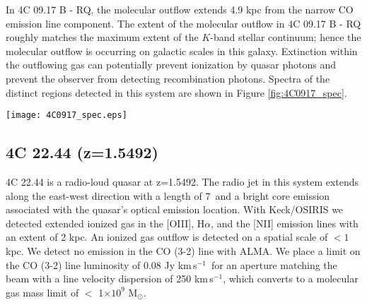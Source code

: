 \documentclass[twocolumn]{aastex63}
\newcommand{\msun}{M$_{\odot}$}
\newcommand{\ha}{H$\alpha$\xspace}
\newcommand{\nii}{[N{\sc II}]\xspace}
\newcommand{\oiii}{[O{\sc III}]\xspace}
\newcommand{\kms}{km\,s$^{-1}$}
\begin{document}
In 4C 09.17 B - RQ, the molecular outflow extends 4.9 kpc from the narrow CO emission line component. The extent of the molecular outflow in 4C 09.17 B - RQ roughly matches the maximum extent of the $K$-band stellar continuum; hence the molecular outflow is occurring on galactic scales in this galaxy. Extinction within the outflowing gas can potentially prevent ionization by quasar photons and prevent the observer from detecting recombination photons. Spectra of the distinct regions detected in this system are shown in Figure \ref{fig:4C0917_spec}.  \\

\begin{figure*}
    \centering
    \texttt{[image: 4C0917\_spec.eps]}
    \caption{ALMA band 4 observations of 4C 09.17. On the left we show optimally extracted intensity map of CO emission in the 4C 09.17 system. The 4C 09.17 is a merger system with molecular outflows detected in both galaxies. The teal contours outline the molecular outflow in the radio-quiet galaxies 4C 09.17 B, while the purple contours outline the molecular outflow detected in the host galaxy of the radio loud quasar 4C 09.17. On the right we show the spectra extracted over the respective outflow regions along with the Gaussian fit model. Dashed lines represent the individual Gaussian components of the emission line fit, while the solid black line represents the sum of all components and a 0th order polynomial fit to any residual continuum. Component 1 (C1) in 4C 09.17 B is the fit to the narrow emission at the systemic redshift of the merging galaxy, that has a velocity offset of about 593 \kms\ relative to 4C 09.17A, while C2 is gas in the outflow. For 4C 09.17 A, C1 corresponds to the outflow gas while C2 is the narrow gas at the systemic redshift of the quasar host galaxy. The systemic redshift of the quasar host galaxy is at 0 \kms. The ellipse in the lower left corner on the right panel shows the beam of our ALMA band 4 observations.}
    \label{fig:4C0917_spec}
\end{figure*}
\subsection{4C 22.44 (z=1.5492)}\label{sec:4c2244}


4C 22.44 is a radio-loud quasar at z=1.5492. The radio jet in this system extends along the east-west direction with a length of 7\arcsec\ and a bright core emission associated with the quasar's optical emission location. With Keck/OSIRIS we detected extended ionized gas in the \oiii, \ha, and the \nii emission lines with an extent of 2 kpc. An ionized gas outflow is detected on a spatial scale of $<1$ kpc. We detect no emission in the CO (3-2) line with ALMA. We place a limit on the CO (3-2) line luminosity of 0.08 Jy \kms\ for an aperture matching the beam with a line velocity dispersion of 250 \kms, which converts to a molecular gas mass limit of $<$ 1$\times10^{9}$ \msun.
\end{document}
